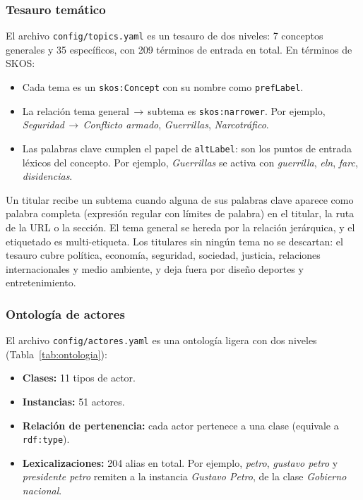 \documentclass[10pt,twocolumn]{article}
\begin{document}
\subsubsection*{Tesauro temático}

El archivo \texttt{config/topics.yaml} es un tesauro de dos niveles: 7
conceptos generales y 35 específicos, con 209 términos de entrada en total.
En términos de SKOS:

\begin{itemize}
\item Cada tema es un \texttt{skos:Concept} con su nombre como
\texttt{prefLabel}.
\item La relación tema general\,$\to$\,subtema es
\texttt{skos:narrower}. Por ejemplo,
\textit{Seguridad}\,$\to$\,\textit{Conflicto armado}, \textit{Guerrillas},
\textit{Narcotráfico}.
\item Las palabras clave cumplen el papel de \texttt{altLabel}: son los
puntos de entrada léxicos del concepto. Por ejemplo, \textit{Guerrillas} se
activa con \textit{guerrilla}, \textit{eln}, \textit{farc},
\textit{disidencias}.
\end{itemize}

Un titular recibe un subtema cuando alguna de sus palabras clave aparece como
palabra completa (expresión regular con límites de palabra) en el titular, la
ruta de la URL o la sección. El tema general se hereda por la relación
jerárquica, y el etiquetado es multi-etiqueta. Los titulares sin ningún tema no
se descartan: el tesauro cubre política, economía, seguridad, sociedad,
justicia, relaciones internacionales y medio ambiente, y deja fuera por diseño
deportes y entretenimiento.

\subsubsection*{Ontología de actores}

El archivo \texttt{config/actores.yaml} es una ontología ligera con dos niveles
(Tabla~\ref{tab:ontologia}):

\begin{itemize}
\item \textbf{Clases:} 11 tipos de actor.
\item \textbf{Instancias:} 51 actores.
\item \textbf{Relación de pertenencia:} cada actor pertenece a una clase
(equivale a \texttt{rdf:type}).
\item \textbf{Lexicalizaciones:} 204 alias en total. Por ejemplo,
\textit{petro}, \textit{gustavo petro} y \textit{presidente petro} remiten a
la instancia \textit{Gustavo Petro}, de la clase \textit{Gobierno nacional}.
\end{itemize}
\end{document}
